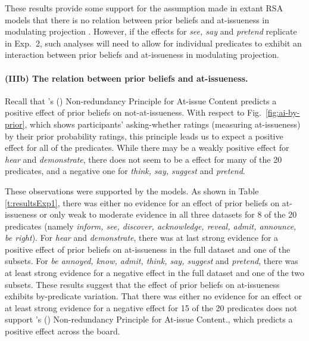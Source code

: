 \documentclass[11pt,fleqn]{article}
\newcommand{\6}{\mbox{$[\hspace*{-.6mm}[$}}
\newcommand{\9}{\mbox{$]\hspace*{-.6mm}]$}}
\newcommand{\citetpos}[1]{\citeauthor{#1}'s (\citeyear{#1})}
\begin{document}
These results provide some support for the assumption made in extant RSA models that there is no relation between prior beliefs and at-issueness in modulating projection \citep{qing-etal2016,stevens-etal2017,warstadt2022,pan-degen2023,scontras-tonhauser2025}. However, if the effects for {\em see, say} and {\em pretend} replicate in Exp.~2, such analyses will need to allow for individual predicates to exhibit an interaction between prior beliefs and at-issueness in modulating projection.

\paragraph{(IIIb) The relation between prior beliefs and at-issueness.} 

Recall that \citetpos{tonhauser-etal-eval} Non-redundancy Principle for At-issue Content predicts a positive effect of prior beliefs on not-at-issueness. With respect to Fig.~\ref{fig:ai-by-prior}, which shows participants' asking-whether ratings (measuring at-issueness) by their prior probability ratings, this principle leads us to expect a positive effect for all of the predicates. While there may be a weakly positive effect for {\em hear} and {\em demonstrate}, there does not seem to be a effect for many of the 20 predicates, and a negative one for {\em think, say, suggest} and {\em pretend}.

These observations were supported by the models. As shown in Table \ref{t:resultsExp1}, there was either no evidence for an effect of prior beliefs on at-issueness or only weak to moderate evidence in all three datasets for 8 of the 20 predicates (namely {\em inform, see, discover, acknowledge, reveal, admit, announce, be right}). For {\em hear} and {\em demonstrate}, there was at last strong evidence for a positive effect of prior beliefs on at-issueness in the full dataset and one of the subsets. For {\em be annoyed, know, admit, think, say, suggest} and {\em pretend}, there was at least strong evidence for a negative effect in the full dataset and one of the two subsets. These results suggest that the effect of prior beliefs on at-issueness exhibits by-predicate variation. That there was either no evidence for an effect or at least strong evidence for a negative effect for 15 of the 20 predicates does not support \citetpos{tonhauser-etal-eval} Non-redundancy Principle for At-issue Content., which predicts a positive effect across the board.


\setlength{\fboxrule}{0pt}
\end{document}
